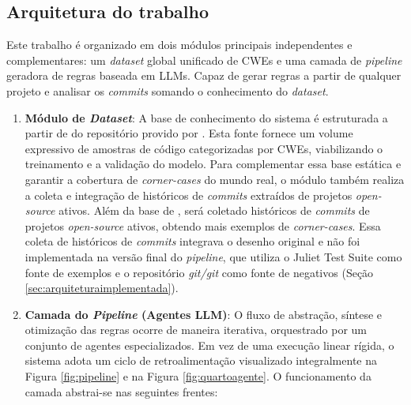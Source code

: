 \documentclass[
    12pt,                %
    openright,           %
    oneside,             %
    a4paper,             %
    english,             %
    brazil               %
]{abntex2}
\newcommand{\novo}[1]{{\color{red}#1}}
\begin{document}
\subsection{Arquitetura do trabalho}
\label{sec:arquitetura}
\par
Este trabalho é organizado em dois módulos principais independentes e complementares: um \textit{dataset} global unificado de CWEs e uma camada de \textit{pipeline} geradora de regras baseada em LLMs.
Capaz de gerar regras a partir de qualquer projeto e analisar os \textit{commits} somando o conhecimento do \textit{dataset}.
\begin{enumerate}
  \item \textbf{Módulo de \textit{Dataset}}:
    A base de conhecimento do sistema é estruturada a partir de do repositório provido por .
Esta fonte fornece um volume expressivo de amostras de código categorizadas por CWEs, viabilizando o treinamento e a validação do modelo.
Para complementar essa base estática e garantir a cobertura de \textit{corner-cases} do mundo real, o módulo também realiza a coleta e integração de históricos de \textit{commits} extraídos de projetos \textit{open-source} ativos.
Além da base de , será coletado históricos de \textit{commits} de projetos \textit{open-source} ativos, obtendo mais exemplos de \textit{corner-cases}. \novo{Essa coleta de históricos de \textit{commits} integrava o desenho original e não foi implementada na versão final do \textit{pipeline}, que utiliza o Juliet Test Suite como fonte de exemplos e o repositório \textit{git/git} como fonte de negativos (Seção \ref{sec:arquiteturaimplementada}).}
\item \textbf{Camada do \textit{Pipeline} (Agentes LLM)}: 
  O fluxo de abstração, síntese e otimização das regras ocorre de maneira iterativa, orquestrado por um conjunto de agentes especializados.
  Em vez de uma execução linear rígida, o sistema adota um ciclo de retroalimentação visualizado integralmente na Figura \ref{fig:pipeline} e na Figura \ref{fig:quartoagente}.
  O funcionamento da camada abstrai-se nas seguintes frentes:


\end{enumerate}
\end{document}

